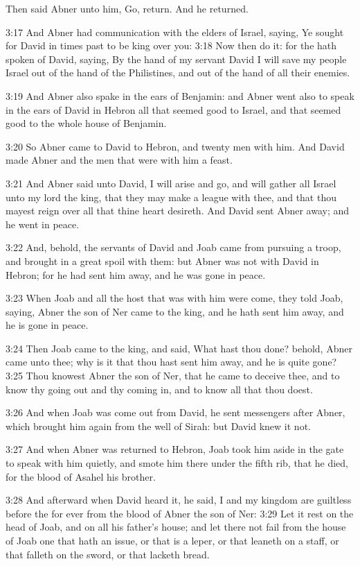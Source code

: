 Then said Abner unto him, Go, return. And he returned.

3:17 And Abner had communication with the elders of Israel, saying, Ye sought for David in times past to be king over you: 3:18 Now then do it: for the \LORD hath spoken of David, saying, By the hand of my servant David I will save my people Israel out of the hand of the Philistines, and out of the hand of all their enemies.

3:19 And Abner also spake in the ears of Benjamin: and Abner went also to speak in the ears of David in Hebron all that seemed good to Israel, and that seemed good to the whole house of Benjamin.

3:20 So Abner came to David to Hebron, and twenty men with him. And David made Abner and the men that were with him a feast.

3:21 And Abner said unto David, I will arise and go, and will gather all Israel unto my lord the king, that they may make a league with thee, and that thou mayest reign over all that thine heart desireth.  And David sent Abner away; and he went in peace.

3:22 And, behold, the servants of David and Joab came from pursuing a troop, and brought in a great spoil with them: but Abner was not with David in Hebron; for he had sent him away, and he was gone in peace.

3:23 When Joab and all the host that was with him were come, they told Joab, saying, Abner the son of Ner came to the king, and he hath sent him away, and he is gone in peace.

3:24 Then Joab came to the king, and said, What hast thou done?  behold, Abner came unto thee; why is it that thou hast sent him away, and he is quite gone?  3:25 Thou knowest Abner the son of Ner, that he came to deceive thee, and to know thy going out and thy coming in, and to know all that thou doest.

3:26 And when Joab was come out from David, he sent messengers after Abner, which brought him again from the well of Sirah: but David knew it not.

3:27 And when Abner was returned to Hebron, Joab took him aside in the gate to speak with him quietly, and smote him there under the fifth rib, that he died, for the blood of Asahel his brother.

3:28 And afterward when David heard it, he said, I and my kingdom are guiltless before the \LORD for ever from the blood of Abner the son of Ner: 3:29 Let it rest on the head of Joab, and on all his father's house; and let there not fail from the house of Joab one that hath an issue, or that is a leper, or that leaneth on a staff, or that falleth on the sword, or that lacketh bread.

